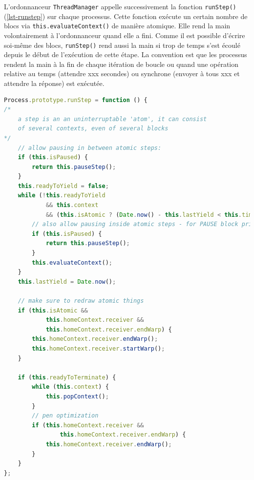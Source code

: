 L'ordonnanceur \texttt{ThreadManager} appelle successivement la fonction \texttt{runStep()} (\ref{lst-runstep}) sur chaque processus. Cette fonction exécute un certain nombre de blocs via \texttt{this.evaluateContext()} de manière atomique. Elle rend la main volontairement à l'ordonnanceur quand elle a fini. Comme il est possible d'écrire soi-même des blocs, \texttt{runStep()} rend aussi la main si trop de temps s'est écoulé depuis le début de l'exécution de cette étape. La convention est que les processus rendent la main à la fin de chaque itération de boucle ou quand une opération relative au temps (attendre xxx secondes) ou synchrone (envoyer à tous xxx et attendre la réponse) est exécutée.

\begin{lstlisting}[caption={Fonction \texttt{runStep()} de \texttt{Process}},label=lst-runstep,language=JavaScript]
Process.prototype.runStep = function () {
/*
    a step is an an uninterruptable 'atom', it can consist
    of several contexts, even of several blocks
*/
    // allow pausing in between atomic steps:
    if (this.isPaused) {
        return this.pauseStep();
    }
    this.readyToYield = false;
    while (!this.readyToYield
            && this.context
            && (this.isAtomic ? (Date.now() - this.lastYield < this.timeout) : true) ) {
        // also allow pausing inside atomic steps - for PAUSE block primitive:
        if (this.isPaused) {
            return this.pauseStep();
        }
        this.evaluateContext();
    }
    this.lastYield = Date.now();

    // make sure to redraw atomic things
    if (this.isAtomic &&
            this.homeContext.receiver &&
            this.homeContext.receiver.endWarp) {
        this.homeContext.receiver.endWarp();
        this.homeContext.receiver.startWarp();
    }

    if (this.readyToTerminate) {
        while (this.context) {
            this.popContext();
        }
        // pen optimization
        if (this.homeContext.receiver &&
                this.homeContext.receiver.endWarp) {
            this.homeContext.receiver.endWarp();
        }
    }
};
\end{lstlisting}



